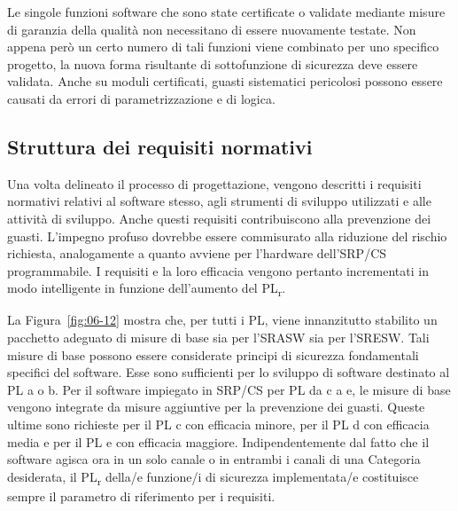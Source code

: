 Le singole funzioni software che sono state certificate o validate mediante misure di garanzia della qualità non necessitano di essere nuovamente testate. Non appena però un certo numero di tali funzioni viene combinato per uno specifico progetto, la nuova forma risultante di sottofunzione di sicurezza deve essere validata. Anche su moduli certificati, guasti sistematici pericolosi possono essere causati da errori di parametrizzazione e di logica.

\subsection{Struttura dei requisiti normativi}
\label{subsec:06-3-6}
Una volta delineato il processo di progettazione, vengono descritti i requisiti normativi relativi al software stesso, agli strumenti di sviluppo utilizzati e alle attività di sviluppo. Anche questi requisiti contribuiscono alla prevenzione dei guasti. L'impegno profuso dovrebbe essere commisurato alla riduzione del rischio richiesta, analogamente a quanto avviene per l'hardware dell'SRP/CS programmabile. I requisiti e la loro efficacia vengono pertanto incrementati in modo intelligente in funzione dell'aumento del PL\textsubscript{r}.

La Figura~\ref{fig:06-12} mostra che, per tutti i PL, viene innanzitutto stabilito un pacchetto adeguato di misure di base sia per l'SRASW sia per l'SRESW. Tali misure di base possono essere considerate principi di sicurezza fondamentali specifici del software. Esse sono sufficienti per lo sviluppo di software destinato al PL a o b. Per il software impiegato in SRP/CS per PL da c a e, le misure di base vengono integrate da misure aggiuntive per la prevenzione dei guasti. Queste ultime sono richieste per il PL c con efficacia minore, per il PL d con efficacia media e per il PL e con efficacia maggiore. Indipendentemente dal fatto che il software agisca ora in un solo canale o in entrambi i canali di una Categoria desiderata, il PL\textsubscript{r} della/e funzione/i di sicurezza implementata/e costituisce sempre il parametro di riferimento per i requisiti.

\begin{center}
    \begin{minipage}{\textwidth}
        \centering
        \captionsetup{hypcap=false}
        \resizebox{0.9\textwidth}{!}{}
        \label{fig:06-12}
    \end{minipage}
\end{center}

